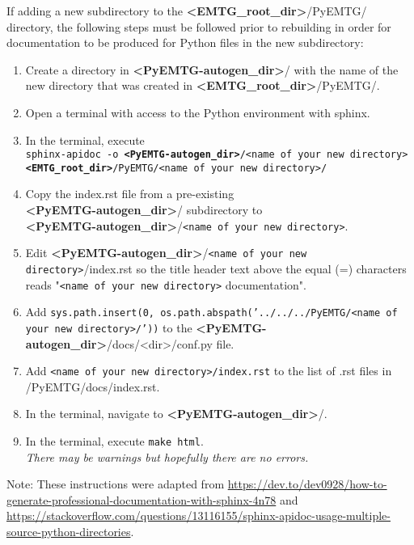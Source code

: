 \documentclass[11pt]{article}
\begin{document}
\noindent If adding a new subdirectory to the \textbf{\textless EMTG\_root\_dir\textgreater}/PyEMTG/ directory, the following steps must be followed prior to rebuilding in order for documentation to be produced for Python files in the new subdirectory:

\begin{enumerate}
	\item Create a directory in \textbf{\textless PyEMTG-autogen\_dir\textgreater}/ with the name of the new directory that was created in \textbf{\textless EMTG\_root\_dir\textgreater}/PyEMTG/.
	\item Open a terminal with access to the Python environment with sphinx.
	\item In the terminal, execute \\ \texttt{sphinx-apidoc -o \textbf{\textless PyEMTG-autogen\_dir\textgreater}/<name of your new directory> \\ \textbf{\textless EMTG\_root\_dir\textgreater}/PyEMTG/<name of your new directory>/}
	\item Copy the index.rst file from a pre-existing \\ \textbf{\textless PyEMTG-autogen\_dir\textgreater}/ subdirectory to \\ \textbf{\textless PyEMTG-autogen\_dir\textgreater}/\texttt{<name of your new directory>}.
	\item Edit \textbf{\textless PyEMTG-autogen\_dir\textgreater}/\texttt{<name of your new directory>}/index.rst so the title header text above the equal (=) characters reads "\texttt{<name of your new directory>} documentation".
	\item Add \texttt{sys.path.insert(0, os.path.abspath('../../../PyEMTG/<name of your new directory>/'))} to the \textbf{\textless PyEMTG-autogen\_dir\textgreater}/docs/\textless dir\textgreater/conf.py file.
	\item Add \texttt{<name of your new directory>/index.rst} to the list of .rst files in /PyEMTG/docs/index.rst.
	\item In the terminal, navigate to \textbf{\textless PyEMTG-autogen\_dir\textgreater}/.
	\item In the terminal, execute \texttt{make html}. \\ \textit{There may be warnings but hopefully there are no errors.}
\end{enumerate}

\noindent Note: These instructions were adapted from \url{https://dev.to/dev0928/how-to-generate-professional-documentation-with-sphinx-4n78} and \url{https://stackoverflow.com/questions/13116155/sphinx-apidoc-usage-multiple-source-python-directories}.
\end{document}
